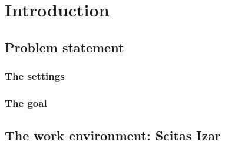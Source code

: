 
\chapter{Introduction}\label{chapter:introduction}

\section{Problem statement}
\subsection{The settings}
\subsection{The goal}
\section{The work environment: Scitas Izar}